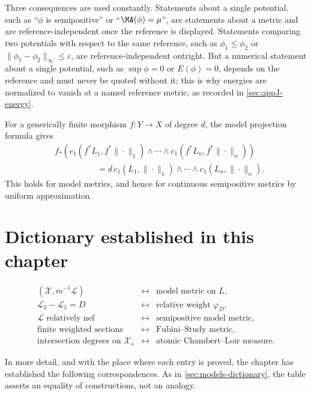 Three consequences are used constantly. Statements about a single potential,
such as ``$\phi$ is semipositive'' or ``$\MA(\phi)=\mu$'', are
statements about a metric and are reference-independent once the reference
is displayed. Statements comparing two potentials with respect to the same
reference, such as $\phi_1\le\phi_2$ or
$\|\phi_1-\phi_2\|_\infty\le\varepsilon$, are reference-independent
outright. But a numerical statement about a single potential, such as
$\sup\phi=0$ or $E(\phi)=0$, depends on the reference and must never be
quoted without it; this is why energies are normalized to vanish at a named
reference metric, as recorded in \cref{sec:appJ-energy}.

For a generically finite morphism $f:Y\to X$ of degree $d$, the model
projection formula gives
\[
 \begin{aligned}
 &f_*\!\left(
 c_1(f^*L_1,f^*\|\cdot\|_1)\wedge\cdots\wedge
 c_1(f^*L_n,f^*\|\cdot\|_n)\right)\\
 &\hspace{5em}=
 d\,c_1(L_1,\|\cdot\|_1)\wedge\cdots\wedge
 c_1(L_n,\|\cdot\|_n).
 \end{aligned}
\]
This holds for model metrics, and hence for continuous semipositive metrics by
uniform approximation.

\section{Dictionary established in this chapter}
\label{sec:metrics-dictionary}

\[
\begin{array}{ccl}
(\mathcal X,m^{-1}\mathcal L)
 &\longleftrightarrow& \text{model metric on }L,\\[1mm]
\mathcal L_2-\mathcal L_1=D
 &\longleftrightarrow& \text{relative weight }\varphi_D,\\[1mm]
\mathcal L\text{ relatively nef}
 &\longleftrightarrow& \text{semipositive model metric},\\[1mm]
\text{finite weighted sections}
 &\longleftrightarrow& \text{Fubini--Study metric},\\[1mm]
\text{intersection degrees on }\mathcal X_s
 &\longleftrightarrow& \text{atomic Chambert--Loir measure}.
\end{array}
\]

In more detail, and with the place where each entry is proved, the chapter
has established the following correspondences. As in
\cref{sec:models-dictionary}, the table asserts an equality of constructions,
not an analogy.

